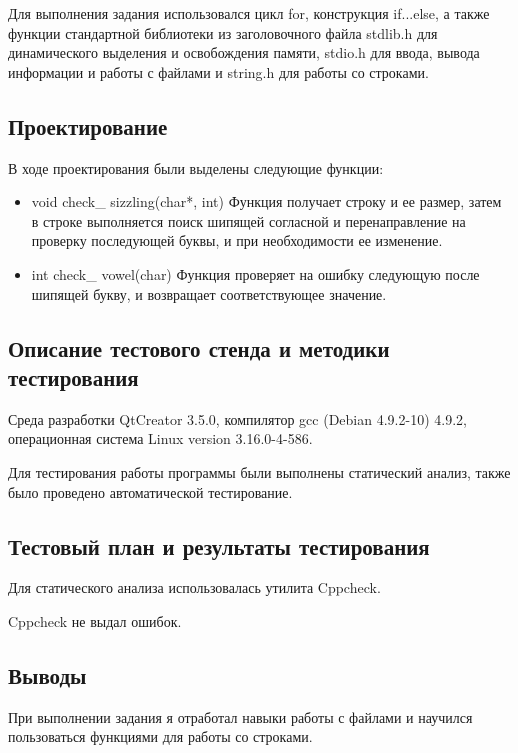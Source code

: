 \documentclass[12pt,a4paper]{report}
\begin{document}
Для выполнения задания использовался цикл for, конструкция if...else, а также функции стандартной библиотеки из заголовочного файла stdlib.h для динамического выделения и освобождения памяти, stdio.h для ввода, вывода информации и работы с файлами и string.h для работы со строками. 

\subsection{Проектирование}

В ходе проектирования были выделены следующие функции:

\begin{itemize}
	 \item void check\_ sizzling(char*, int)
 	Функция получает строку и ее размер, затем в строке выполняется поиск шипящей согласной и перенаправление на проверку последующей буквы, и при необходимости ее изменение.
 	
 	\item int check\_ vowel(char)
 	Функция проверяет на ошибку следующую после шипящей букву, и возвращает соответствующее значение.
\end{itemize}
	
	
\subsection{Описание тестового стенда и методики тестирования}
Среда разработки QtCreator 3.5.0, компилятор gcc (Debian 4.9.2-10) 4.9.2, операционная система Linux version 3.16.0-4-586.

Для тестирования работы программы были выполнены статический анализ, также было проведено автоматической тестирование.
\subsection{Тестовый план и результаты тестирования}

Для статического анализа использовалась утилита Cppcheck.

\vspace{\baselineskip}
 Cppcheck не выдал ошибок.

\vspace{\baselineskip}

\subsection{Выводы}

При выполнении задания я отработал навыки работы с файлами и научился пользоваться функциями для работы со строками.
\end{document}
